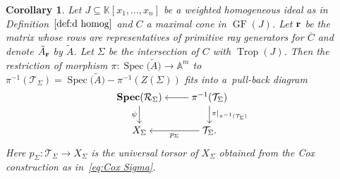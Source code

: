 \documentclass[pdftex]{sigma}%
\newtheorem{Corollary}[Theorem]{Corollary}
\numberwithin{equation}{section}
\DeclareMathOperator{\GF}{GF}
\DeclareMathOperator{\trop}{Trop}
\begin{document}
\begin{Corollary}
Let $J\subseteq\mathbb K[{x_1,\dots,x_n}]$ be a weighted homogeneous ideal as in Definition~$\ref{def:d homog}$ and $C$ a maximal cone in $\GF(J)$.
Let ${\bf r}$ be the matrix whose rows are representatives of primitive ray generators for $\overline C$ %
and denote $\tilde A_{\bf r}$ by $\tilde A$.
Let $\Sigma$ be the intersection of $C$ with $\trop(J)$.
Then the restriction of morphism $\pi\colon \operatorname{Spec}\big(\tilde A\big)\to \mathbb A^m$ to $\pi^{-1}(\mathcal T_\Sigma)=\operatorname{Spec}\big(\tilde A\big)-\pi^{-1}(Z(\Sigma))$ fits into a~pull-back diagram
 \begin{equation*}%
 \begin{tikzcd}[ampersand replacement=\&,cramped]
 \mathbf{Spec}(\mathcal R_\Sigma)\ar[d,"\psi"'] \&
 \pi^{-1}(\mathcal T_\Sigma)\ar[d,"\pi\vert_{\pi^{-1}(\mathcal T_\Sigma)}"] \ar[l]\\
 X_{\Sigma}\& \mathcal T_\Sigma. \ar[l,"p_\Sigma"]
 \end{tikzcd}
 \end{equation*}
Here $p_\Sigma\colon \mathcal T_\Sigma\to X_\Sigma$ is the universal torsor of $X_\Sigma$ obtained from the Cox construction as in~\eqref{eq:Cox Sigma}.
\end{Corollary}
\end{document}
